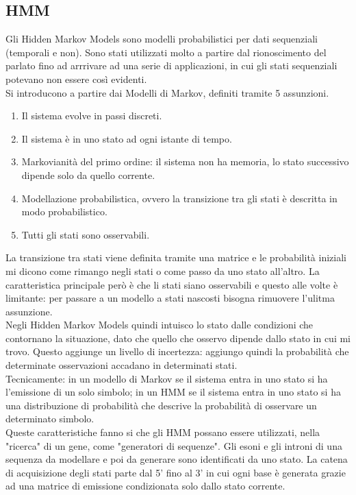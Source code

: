 \documentclass{article}
\begin{document}
\subsection*{HMM}
Gli Hidden Markov Models sono modelli probabilistici per dati sequenziali (temporali e non). Sono stati utilizzati molto a partire dal rionoscimento del parlato fino ad arrrivare ad una serie di applicazioni, in cui gli stati sequenziali potevano non essere così evidenti.\\
Si introducono a partire dai Modelli di Markov, definiti tramite 5 assunzioni.
\begin{enumerate}
    \item Il sistema evolve in passi discreti.
    \item Il sistema è in uno stato ad ogni istante di tempo.
    \item Markovianità del primo ordine: il sistema non ha memoria, lo stato successivo dipende solo da quello corrente.
    \item Modellazione probabilistica, ovvero la transizione tra gli stati è descritta in modo probabilistico.
    \item Tutti gli stati sono osservabili.
\end{enumerate}
La transizione tra stati viene definita tramite una matrice e le probabilità iniziali mi dicono come rimango negli stati o come passo da uno stato all'altro. La caratteristica principale però è che li stati siano osservabili e questo alle volte è limitante: per passare a un modello a stati nascosti bisogna rimuovere l'ulitma assunzione. \\
Negli Hidden Markov Models quindi intuisco lo stato dalle condizioni che contornano la situazione, dato che quello che osservo dipende dallo stato in cui mi trovo. Questo aggiunge un livello di incertezza: aggiungo quindi la probabilità che determinate osservazioni accadano in determinati stati.\\
Tecnicamente: in un modello di Markov se il sistema entra in uno stato si ha l'emissione di un solo simbolo; in un HMM se il sistema entra in uno stato si ha una distribuzione di probabilità che descrive la probabilità di osservare un determinato simbolo.\\
Queste caratteristiche fanno si che gli HMM possano essere utilizzati, nella "ricerca" di un gene, come "generatori di sequenze". Gli esoni e gli introni di una sequenza da modellare e poi da generare sono identificati da uno stato. La catena di acquisizione degli stati parte dal 5' fino al 3' in cui ogni base è generata grazie ad una matrice di emissione condizionata solo dallo stato corrente.
\end{document}
